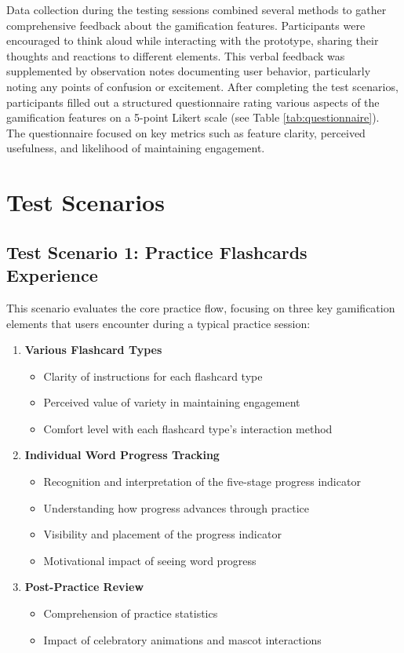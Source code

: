 Data collection during the testing sessions combined several methods to gather comprehensive feedback about the gamification features. Participants were encouraged to think aloud while interacting with the prototype, sharing their thoughts and reactions to different elements. This verbal feedback was supplemented by observation notes documenting user behavior, particularly noting any points of confusion or excitement. After completing the test scenarios, participants filled out a structured questionnaire rating various aspects of the gamification features on a 5-point Likert scale (see Table \ref{tab:questionnaire}). The questionnaire focused on key metrics such as feature clarity, perceived usefulness, and likelihood of maintaining engagement.



\section{Test Scenarios}

\subsection*{Test Scenario 1: Practice Flashcards Experience}
This scenario evaluates the core practice flow, focusing on three key gamification elements that users encounter during a typical practice session:

\begin{enumerate}
    \item \textbf{Various Flashcard Types}
    \begin{itemize}
        \item Clarity of instructions for each flashcard type 
        \item Perceived value of variety in maintaining engagement
        \item Comfort level with each flashcard type's interaction method
    \end{itemize}

    \item \textbf{Individual Word Progress Tracking}
    \begin{itemize}
        \item Recognition and interpretation of the five-stage progress indicator
        \item Understanding how progress advances through practice
        \item Visibility and placement of the progress indicator
        \item Motivational impact of seeing word progress
    \end{itemize}

    \item \textbf{Post-Practice Review}
    \begin{itemize}
        \item Comprehension of practice statistics
        \item Impact of celebratory animations and mascot interactions
    \end{itemize}
\end{enumerate}

